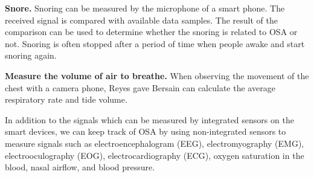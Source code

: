     \textbf{Snore. } Snoring can be measured by the microphone of a smart phone. The received signal is compared with available data samples. The result of the comparison can be used to determine whether the snoring is related to OSA or not. Snoring is often stopped after a period of time when people awake and start snoring again.

    \textbf{Measure the volume of air to breathe.} When observing the movement of the chest with a camera phone, Reyes gave Bersain\citep{BersainReyes} can calculate the average respiratory rate and tide volume.

    In addition to the signals which can be measured by integrated sensors on the smart devices, we can keep track of OSA by using non-integrated sensors to measure signals such as electroencephalogram (EEG), electromyography (EMG), electrooculography (EOG), electrocardiography (ECG), oxygen saturation in the blood, nasal airflow, and blood pressure.\\

